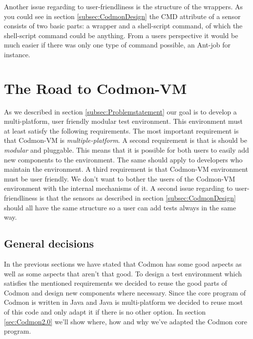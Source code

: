 \documentclass{article}
\newcommand{\project}{Codmon-VM}
\begin{document}
\noindent Another issue regarding to user-friendliness is the structure of the wrappers. As you could see in section \ref{subsec:CodmonDesign} the CMD attribute of a sensor consists of two basic parts: 
a wrapper and a shell-script command, of which the shell-script command could be anything. From a users perspective it would be much easier if there was only one type of command possible, an Ant-job\cite{Ant} 
for instance.

\newpage
\section{The Road to \project{}}
\label{sec:road}
As we described in section \ref{subsec:Problemstatement} our goal is to develop a multi-platform, user friendly modular test environment. This environment must at least satisfy the following requirements. 
The most important requirement is that \project{} is \emph{multiple-platform}. A second requirement is that is should be \emph{modular} and pluggable. This means that it is possible for both users to easily 
add new components to the environment. The same should apply to developers who maintain the environment. A third requirement is that \project{} environment must be user friendly. We don't want to bother 
the users of the \project{} environment with the internal mechanisms of it. A second issue regarding to user-friendliness is that the sensors as described in section \ref{subsec:CodmonDesign} should all 
have the same structure so a user can add tests always in the same way.\\

\subsection{General decisions}
\label{subsec:general}
In the previous sections we have stated that Codmon has some good aspects as well as some aspects that aren't that good. To design a test environment which satisfies the mentioned requirements 
we decided to reuse the good parts of Codmon and design new components where necessary. Since the core program of Codmon is written in Java and Java is multi-platform we decided to reuse most of this code 
and only adapt it if there is no other option. In section \ref{sec:Codmon2.0} we'll show where, how and why we've adapted the Codmon core program. 
\end{document}
